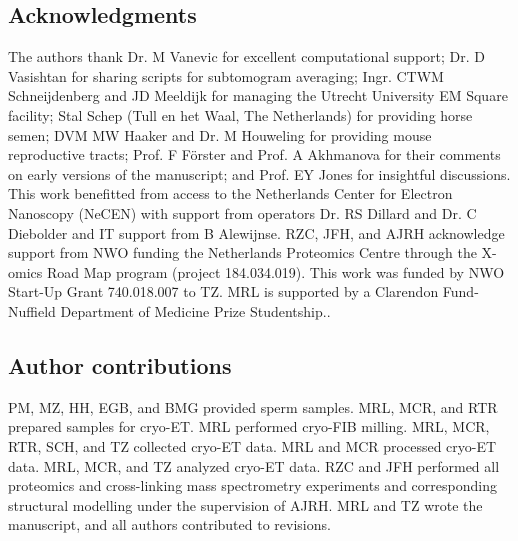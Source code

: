 \subsection*{Acknowledgments}
The authors thank Dr. M Vanevic for excellent computational support; Dr. D Vasishtan for sharing scripts for subtomogram averaging; Ingr. CTWM Schneijdenberg and JD Meeldijk for managing the Utrecht University EM Square facility; Stal Schep (Tull en het Waal, The Netherlands) for providing horse semen; DVM MW Haaker and Dr. M Houweling for providing mouse reproductive tracts; Prof. F Förster and Prof. A Akhmanova for their comments on early versions of the manuscript; and Prof. EY Jones for insightful discussions. This work benefitted from access to the Netherlands Center for Electron Nanoscopy (NeCEN) with support from operators Dr. RS Dillard and Dr. C Diebolder and IT support from B Alewijnse. RZC, JFH, and AJRH acknowledge support from NWO funding the Netherlands Proteomics Centre through the X-omics Road Map program (project 184.034.019). This work was funded by NWO Start-Up Grant 740.018.007 to TZ. MRL is supported by a Clarendon Fund-Nuffield Department of Medicine Prize Studentship..
%
\subsection*{Author contributions}
PM, MZ, HH, EGB, and BMG provided sperm samples. MRL, MCR, and RTR prepared samples for cryo-ET. MRL performed cryo-FIB milling. MRL, MCR, RTR, SCH, and TZ collected cryo-ET data. MRL and MCR processed cryo-ET data. MRL, MCR, and TZ analyzed cryo-ET data. RZC and JFH performed all proteomics and cross-linking mass spectrometry experiments and corresponding structural modelling under the supervision of AJRH. MRL and TZ wrote the manuscript, and all authors contributed to revisions.
%
